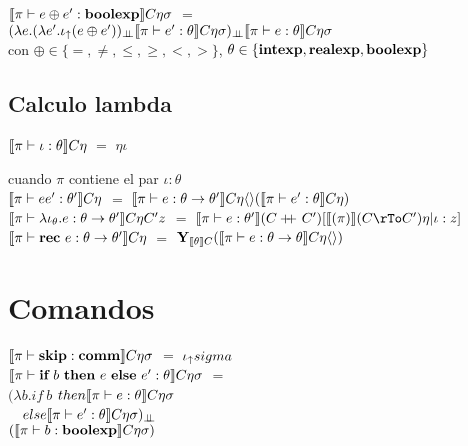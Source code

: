 \noindent
$\llbracket  \pi \vdash e \oplus e' : \textbf{boolexp}  \rrbracket C\eta\sigma$ 
$=$ \\
\indent
$(\lambda e . (\lambda e' . \iota_{\uparrow} (e \oplus e'))_{\bot \!\!\! \bot}
\llbracket \pi \vdash e' : \theta \rrbracket C\eta\sigma)_{\bot \!\!\! \bot}
\llbracket \pi \vdash e : \theta \rrbracket C\eta\sigma$\\

con $\oplus \in \{ =,\neq,\leq,\geq,<,> \}$, $\theta \in \{\textbf{intexp},\textbf{realexp},\textbf{boolexp}\}$\\

\subsection{Calculo lambda}

$\llbracket  \pi \vdash \iota : \theta  \rrbracket C\eta$ $=$ $\eta\iota$

cuando $\pi$ contiene el par $\iota:\theta$\\

\noindent
$\llbracket  \pi \vdash ee' : \theta'  \rrbracket C\eta$ 
$=$ 
$\llbracket  \pi \vdash e : \theta \rightarrow \theta'  \rrbracket C\eta\langle\rangle
(\llbracket  \pi \vdash e' : \theta  \rrbracket C\eta)$\\

\noindent
$\llbracket  \pi \vdash \lambda \iota_{\theta} . e : \theta \rightarrow \theta'  \rrbracket C \eta C'z$ 
$=$ 
$\semBrcks{ \pi \vdash e : \theta' }(C \concat C')
[\semBrcks{(\pi)}(C \rTo C')\eta | \iota:z]$\\

\noindent
$\llbracket  \pi \vdash \textbf{rec} \ e : \theta \rightarrow \theta'  \rrbracket C \eta$ 
$=$ 
$\textbf{Y}_{\llbracket \theta \rrbracket C} 
(\llbracket  \pi \vdash e : \theta \rightarrow \theta \rrbracket C\eta\langle\rangle)$\\

\section{Comandos}

$\llbracket  \pi \vdash \textbf{skip} : \textbf{comm}  \rrbracket C\eta\sigma$ 
$=$ $\iota_{\uparrow} sigma$\\

\noindent
$\llbracket  \pi \vdash \textbf{if} \ b \ \textbf{then} \ e \ \textbf{else} \ e': \theta  \rrbracket C\eta\sigma$ 
$=$ \\
\indent
$(\lambda b . if \ b $ $then \llbracket  \pi \vdash e : \theta \rrbracket C\eta\sigma$\\
\indent \indent \indent \ \ 
$else \llbracket  \pi \vdash e' : \theta \rrbracket C\eta\sigma)_{\bot \!\!\! \bot}$\\
\indent \indent \indent \indent
$(\llbracket  \pi \vdash b : \textbf{boolexp} \rrbracket C\eta\sigma)$\\

